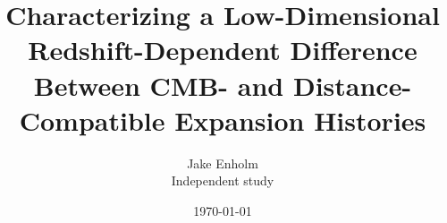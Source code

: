 \documentclass[11pt]{article}
\title{%
  Characterizing a Low-Dimensional Redshift-Dependent Difference
  Between CMB- and Distance-Compatible Expansion Histories
}
\author{Jake Enholm\\Independent study}
\date{\today}
\begin{document}
\maketitle

\begin{abstract}

\end{abstract}








\FloatBarrier




\clearpage\appendix




\clearpage
\end{document}

